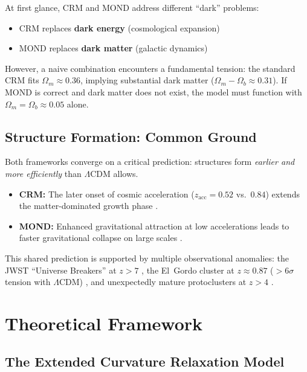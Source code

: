\documentclass[aps,prd,twocolumn,superscriptaddress,nofootinbib]{revtex4-2}
\begin{document}
At first glance, CRM and MOND address different ``dark'' problems:
\begin{itemize}
\item CRM replaces \textbf{dark energy} (cosmological expansion)
\item MOND replaces \textbf{dark matter} (galactic dynamics)
\end{itemize}

However, a naive combination encounters a fundamental tension: the standard CRM fits $\Omega_m \approx 0.36$, implying substantial dark matter ($\Omega_m - \Omega_b \approx 0.31$). If MOND is correct and dark matter does not exist, the model must function with $\Omega_m = \Omega_b \approx 0.05$ alone.

\subsection{Structure Formation: Common Ground}

Both frameworks converge on a critical prediction: structures form \textit{earlier and more efficiently} than $\Lambda$CDM allows.

\begin{itemize}
\item \textbf{CRM:} The later onset of cosmic acceleration ($z_{\mathrm{acc}} = 0.52$ vs.\ $0.84$) extends the matter-dominated growth phase \cite{Geiger2026}.
\item \textbf{MOND:} Enhanced gravitational attraction at low accelerations leads to faster gravitational collapse on large scales \cite{Asencio2023}.
\end{itemize}

This shared prediction is supported by multiple observational anomalies: the JWST ``Universe Breakers'' at $z > 7$ \cite{Labbe2023, BoylanKolchin2023}, the El~Gordo cluster at $z \approx 0.87$ (${>}6\sigma$ tension with $\Lambda$CDM) \cite{Asencio2023}, and unexpectedly mature protoclusters at $z > 4$ \cite{Miller2018}.


\section{Theoretical Framework}
\label{sec:theory}

\subsection{The Extended Curvature Relaxation Model}
\end{document}
